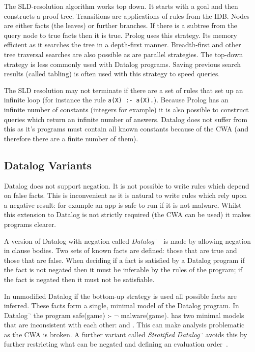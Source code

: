 \documentclass[thesis.tex]{subfiles}
\begin{document}
The SLD-resolution algorithm works top down. It starts with a goal and
then constructs a proof tree. Transitions are applications of rules
from the IDB. Nodes are either facts (the leaves) or further
branches. If there is a subtree from the query node to true facts then
it is true. Prolog uses this strategy. Its memory efficient as it
searches the tree in a depth-first manner. Breadth-first and other
tree traversal searches are also possible as are parallel
strategies. The top-down strategy is less commonly used with Datalog
programs. Saving previous search results (called tabling) is often
used with this strategy to speed queries.

The SLD resolution may not terminate if there are a set of rules that
set up an infinite loop (for instance the rule \lstinline!a(X) :- a(X).!).
Because Prolog has an infinite number of constants (integers
for example) it is also possible to construct queries which return an
infinite number of answers. Datalog does not suffer from this as it's
programs must contain all known constants because of the \ac{CWA} (and
therefore there are a finite number of them).


\subsection{Datalog Variants}

Datalog does not support negation. It is not possible to write
rules which depend on false facts.  This is inconvenient as it is
natural to write rules which rely upon a negative result: for example
an app is safe to run if it is not malware.  Whilst this extension to Datalog is
not strictly required (the \ac{CWA} can be used) it makes programs clearer.

A version of Datalog with negation called
\emph{Datalog$^\lnot$}~\cite{Ceri:1989ff} is made by allowing negation in clause
bodies. Two sets of known facts are defined: those that are true and those that
are false.  When deciding if a fact is satisfied by a Datalog program if the
fact is not negated then it must be inferable by the rules of the program; if
the fact is negated then it must not be satisfiable.  

In unmodified Datalog if the bottom-up strategy
is used all possible facts are inferred. These facts form a single, minimal
model of the Datalog program.  In Datalog$^\lnot$ the program \textsf{safe(game)
:- $\mathsf\lnot$ malware(game).} has two minimal models that are inconsistent
with each other:  and .  This can make
analysis problematic as the \ac{CWA} is broken. A further variant called
\emph{Stratified Datalog$^\lnot$} avoids this by further restricting what can be
negated and defining an evaluation order~\cite{Apt:1986vj}.
\end{document}
